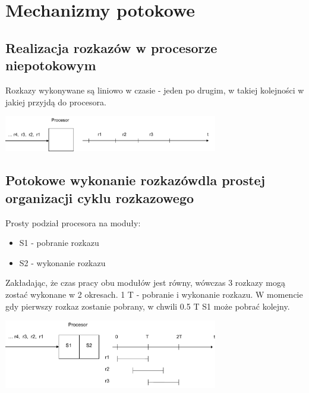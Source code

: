 \section{Mechanizmy potokowe}
	\subsection{Realizacja rozkazów w procesorze niepotokowym}
		Rozkazy wykonywane są liniowo w czasie - jeden po drugim, w takiej kolejności w jakiej przyjdą do procesora.
		\begin{center}
			\includegraphics[width=0.7\textwidth]{./images/potok01}
		\end{center}
   	\subsection{Potokowe wykonanie rozkazówdla prostej organizacji cyklu rozkazowego}
   		Prosty podział procesora na moduły:
	   	\begin{itemize}
	   		\item S1 - pobranie rozkazu
	   		\item S2 - wykonanie rozkazu
	   	\end{itemize}
   		Zakładając, że czas pracy obu modułów jest równy, wówczas 3 rozkazy mogą zostać wykonane w 2 okresach. 1 T - pobranie i wykonanie rozkazu. W momencie gdy pierwszy rozkaz zostanie pobrany, w chwili 0.5 T S1 może pobrać kolejny.
   		\begin{center}
   			\includegraphics[width=0.7\textwidth]{./images/potok02}
   		\end{center}
